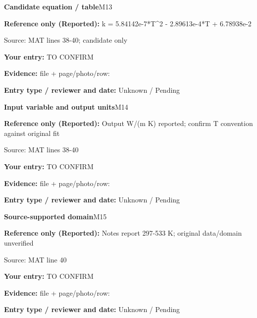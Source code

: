 \documentclass[11pt]{article}
\begin{document}
\begin{minipage}{\textwidth}\small
{\color{navy}\bfseries Candidate equation / table}\hfill M13\par
\colorbox{pale}{\parbox{\dimexpr\linewidth-2\fboxsep\relax}{
\textbf{Reference only (Reported):} k = 5.84142e-7*T\textasciicircum{}2 - 2.89613e-4*T + 6.78938e-2\par
{\footnotesize Source: MAT lines 38-40; candidate only}}}\par
\textbf{Your entry:} {\color{muted}TO CONFIRM}\enspace\hrulefill\par
{\footnotesize\textbf{Evidence:} file + page/photo/row: \hrulefill\par
\textbf{Entry type / reviewer and date:} Unknown / Pending\par
}\end{minipage}\par\vspace{5pt}
\begin{minipage}{\textwidth}\small
{\color{navy}\bfseries Input variable and output units}\hfill M14\par
\colorbox{pale}{\parbox{\dimexpr\linewidth-2\fboxsep\relax}{
\textbf{Reference only (Reported):} Output W/(m K) reported; confirm T convention against original fit\par
{\footnotesize Source: MAT lines 38-40}}}\par
\textbf{Your entry:} {\color{muted}TO CONFIRM}\enspace\hrulefill\par
{\footnotesize\textbf{Evidence:} file + page/photo/row: \hrulefill\par
\textbf{Entry type / reviewer and date:} Unknown / Pending\par
}\end{minipage}\par\vspace{5pt}
\begin{minipage}{\textwidth}\small
{\color{navy}\bfseries Source-supported domain}\hfill M15\par
\colorbox{pale}{\parbox{\dimexpr\linewidth-2\fboxsep\relax}{
\textbf{Reference only (Reported):} Notes report 297-533 K; original data/domain unverified\par
{\footnotesize Source: MAT line 40}}}\par
\textbf{Your entry:} {\color{muted}TO CONFIRM}\enspace\hrulefill\par
{\footnotesize\textbf{Evidence:} file + page/photo/row: \hrulefill\par
\textbf{Entry type / reviewer and date:} Unknown / Pending\par
}\end{minipage}\par\vspace{5pt}
\end{document}

